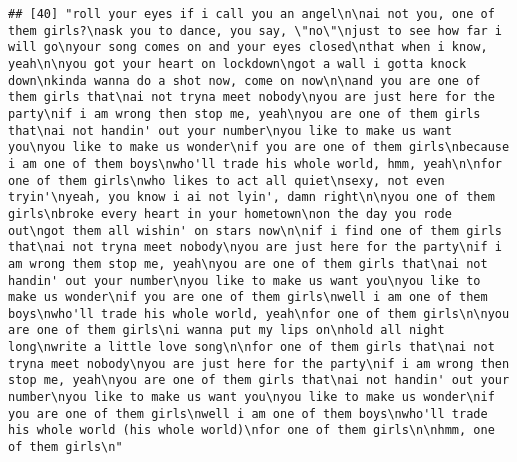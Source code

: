 \documentclass[]{article}
\begin{document}
\begin{verbatim}
## [40] "roll your eyes if i call you an angel\n\nai not you, one of them girls?\nask you to dance, you say, \"no\"\njust to see how far i will go\nyour song comes on and your eyes closed\nthat when i know, yeah\n\nyou got your heart on lockdown\ngot a wall i gotta knock down\nkinda wanna do a shot now, come on now\n\nand you are one of them girls that\nai not tryna meet nobody\nyou are just here for the party\nif i am wrong then stop me, yeah\nyou are one of them girls that\nai not handin' out your number\nyou like to make us want you\nyou like to make us wonder\nif you are one of them girls\nbecause i am one of them boys\nwho'll trade his whole world, hmm, yeah\n\nfor one of them girls\nwho likes to act all quiet\nsexy, not even tryin'\nyeah, you know i ai not lyin', damn right\n\nyou one of them girls\nbroke every heart in your hometown\non the day you rode out\ngot them all wishin' on stars now\n\nif i find one of them girls that\nai not tryna meet nobody\nyou are just here for the party\nif i am wrong them stop me, yeah\nyou are one of them girls that\nai not handin' out your number\nyou like to make us want you\nyou like to make us wonder\nif you are one of them girls\nwell i am one of them boys\nwho'll trade his whole world, yeah\nfor one of them girls\n\nyou are one of them girls\ni wanna put my lips on\nhold all night long\nwrite a little love song\n\nfor one of them girls that\nai not tryna meet nobody\nyou are just here for the party\nif i am wrong then stop me, yeah\nyou are one of them girls that\nai not handin' out your number\nyou like to make us want you\nyou like to make us wonder\nif you are one of them girls\nwell i am one of them boys\nwho'll trade his whole world (his whole world)\nfor one of them girls\n\nhmm, one of them girls\n"                                                                                                                                                                                                                                                                                                                                                                                                                                                                                                                                                                                                                                                                                                                                                                                                                                                                                                                                                                                                                                                                                                                                     

\end{verbatim}
\end{document}
